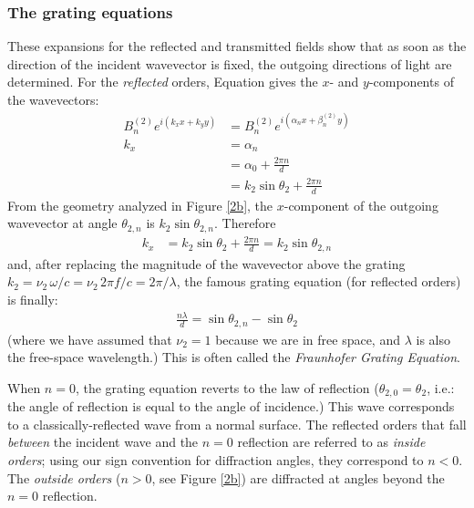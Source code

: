 \subsubsection{The grating equations}
These expansions for the reflected and transmitted fields show that as soon as the direction of the incident wavevector is fixed, the outgoing directions of light are determined.  For the \emph{reflected} orders, Equation  gives the $x$- and $y$-components of the wavevectors:
\begin{align}
B^{(2)}_n e^{i(k_x x + k_y y)} &= B^{(2)}_n e^{i(\alpha_n x + \beta^{(2)}_n y)} \\
k_x &= \alpha_n \\
  &= \alpha_0 + \frac{ 2\pi n}{d} \\
  &= k_2 \sin \theta_2 +\frac{ 2\pi n}{d}
\end{align}
From the geometry analyzed in Figure \ref{2b}, the $x$-component of the outgoing wavevector at angle $\theta_{2,n}$ is $k_2 \sin \theta_{2,n}$.  Therefore
\begin{align}
\label{kxEqn2}
k_x &= k_2 \sin \theta_2 +\frac{ 2\pi n}{d} = k_2 \sin \theta_{2,n}
\end{align}
and, after replacing the magnitude of the wavevector above the grating $k_2 = \nu_2\, \omega / c = \nu_2 \, 2\pi f / c =  2\pi / \lambda$, the famous grating equation (for reflected orders) is finally:
\begin{align}
\label{gratingEquation}
\frac{n \lambda}{d} = \sin \theta_{2,n} -  \sin \theta_{2}
\end{align}
(where we have assumed that $\nu_2 = 1$ because we are in free space, and $\lambda$ is also the free-space wavelength.) This is often called the \emph{Fraunhofer Grating Equation}.

When $n=0$, the grating equation reverts to the law of reflection ($\theta_{2,0} = \theta_2$, i.e.: the angle of reflection is equal to the angle of incidence.)  This wave corresponds to a classically-reflected wave from a normal surface.  The reflected orders that fall \emph{between} the incident wave and the $n=0$ reflection are referred to as \emph{inside orders}; using our sign convention for diffraction angles, they correspond to $n<0$.  The \emph{outside orders} ($n>0$, see Figure \ref{2b}) are diffracted at angles beyond the $n=0$ reflection.

